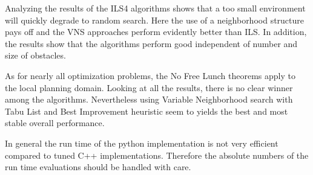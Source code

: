 Analyzing the results of the ILS4 algorithms shows that a too small environment will quickly degrade to random search. 
Here the use of a neighborhood structure pays off and the VNS approaches perform evidently better than ILS. 
In addition, the results show that the algorithms perform good independent of number and size of obstacles.

As for nearly all optimization problems, the No Free Lunch theorems \cite{wolpert1997no} apply to the local planning domain. 
Looking at all the results, there is no clear winner among the algorithms. 
Nevertheless using Variable Neighborhood search with Tabu List and Best Improvement heuristic seem to yields the best and most stable overall performance. 

In general the run time of the python implementation is not very efficient compared to tuned C++ implementations. 
Therefore the absolute numbers of the run time evaluations should be handled with care. 
